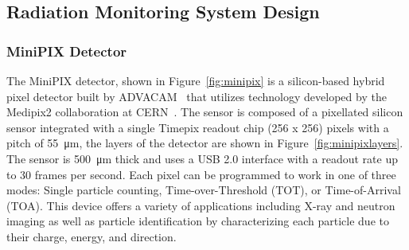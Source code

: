 \subsection{Radiation Monitoring System Design}
\label{sec:Radiation Design}
\subsubsection{MiniPIX Detector}
The MiniPIX detector, shown in Figure~\ref{fig:minipix} is a silicon-based hybrid pixel detector built by ADVACAM~\cite{advacam} that utilizes technology developed by the Medipix2 collaboration at CERN~\cite{medipix}. The sensor is composed of a pixellated silicon sensor integrated with a single Timepix readout chip (256 x 256) pixels with a pitch of \SI{55}{\micro\meter}, the layers of the detector are shown in Figure~\ref{fig:minipixlayers}. The sensor is \SI{500}{\micro\meter} thick and uses a USB 2.0 interface with a readout rate up to 30 frames per second. Each pixel can be programmed to work in one of three modes: Single particle counting, Time-over-Threshold (TOT), or Time-of-Arrival (TOA). This device offers a variety of applications including X-ray and neutron imaging as well as particle identification by characterizing each particle due to their charge, energy, and direction.

